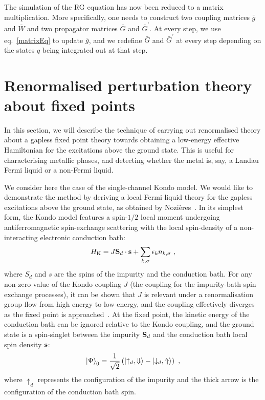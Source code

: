 The simulation of the RG equation has now been reduced to a matrix multiplication. More specifically, one needs to construct two coupling matrices \(\bar g\)  and \(\bar W\) and two propagator matrices \(\bar G\) and \(\bar G^\prime\). At every step, we use eq.~\ref{matrixEq} to update \(\bar g\), and we redefine \(\bar G\) and \(\bar G^\prime\) at every step depending on the states \(q\) being  integrated out at that step. 

\section{Renormalised perturbation theory about fixed points}
In this section, we will describe the technique of carrying out renormalised theory about a gapless fixed point theory towards obtaining a low-energy effective Hamiltonian for the excitations above the ground state. This is useful for characterising metallic phases, and detecting whether the metal is, say, a Landau Fermi liquid or a non-Fermi liquid.

We consider here the case of the single-channel Kondo model. We would like to demonstrate the method by deriving a local Fermi liquid theory for the gapless excitations above the ground state, as obtained by Nozières~\cite{nozieres1974fermi}. In its simplest form, the Kondo model features a spin-\(1/2\) local moment undergoing antiferromagnetic spin-exchange scattering with the local spin-density of a non-interacting electronic conduction bath:
\begin{equation}\begin{aligned}\label{kondoHam}
	H_\text{K} = J {\bf S}_d \cdot {\bf s} + \sum_{k,\sigma}\epsilon_k n_{k,\sigma}~,
\end{aligned}\end{equation}
where \(S_d\) and \(s\) are the spins of the impurity and the conduction bath. For any non-zero value of the Kondo coupling \(J\) (the coupling for the impurity-bath spin exchange processes), it can be shown that \(J\) is relevant under a renormalisation group flow from high energy to low-energy, and the coupling effectively diverges as the fixed point is approached~\cite{wilson1975}. At the fixed point, the kinetic energy of the conduction bath can be ignored relative to the Kondo coupling, and the ground state is a spin-singlet between the impurity \({\bf S}_d\) and the conduction bath local spin density \({\bf s}\):
\begin{equation}\begin{aligned}
	\ket{\Psi}_0 = \frac{1}{\sqrt 2}\left(\ket{\uparrow_d, \Downarrow} - \ket{\downarrow_d, \Uparrow}\right)~,
\end{aligned}\end{equation}
where \(\uparrow_d\) represents the configuration of the impurity and the thick arrow is the configuration of the conduction bath spin.

